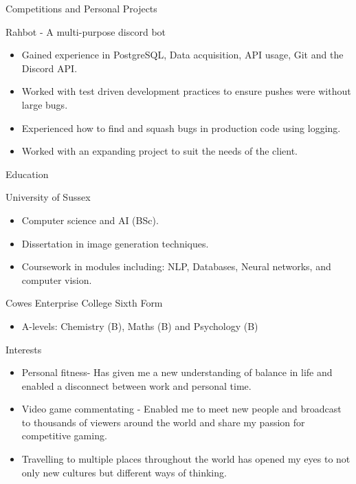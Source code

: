 \documentclass[a4paper]{article}
\newlength{\tabin}
\newlength{\secsep}
\newcommand{\lineunder}{\vspace*{-8pt} \\ \hspace*{-6pt} \hrulefill \\ \vspace*{-15pt}}
\newenvironment{tabbedsection}[1]{
  \begin{list}{}{
      \setlength{\itemsep}{0pt}
      \setlength{\labelsep}{0pt}
      \setlength{\labelwidth}{0pt}
      \setlength{\leftmargin}{\tabin}
      \setlength{\rightmargin}{\tabin}
      \setlength{\listparindent}{0pt}
      \setlength{\parsep}{0pt}
      \setlength{\parskip}{0pt}
      \setlength{\partopsep}{0pt}
      \setlength{\topsep}{#1}
    }
  \item[]
}{\end{list}}
\newenvironment{resume_section}[1]{
  \filbreak
  \vspace{2\secsep}
  \textsc{\large#1}
  \lineunder
  \begin{tabbedsection}{\secsep}
}{\end{tabbedsection}}
\newenvironment{resume_subsection}[2][]{
  \textbf{#2} \hfill {\footnotesize #1} \hspace{2em}
  \begin{tabbedsection}{0.5\secsep}
}{\end{tabbedsection}}
\newenvironment{subitems}{
  \renewcommand{\labelitemi}{-}
  \begin{itemize}
      \setlength{\labelsep}{1em}
}{\end{itemize}}
\begin{document}
\begin{resume_section}{Competitions and Personal Projects}
  
   \begin{resume_subsection}{Rahbot - A multi-purpose discord bot}
    \begin{subitems}
        \item Gained experience in PostgreSQL, Data acquisition, API usage, Git and the Discord API.
        \item Worked with test driven development practices to ensure pushes were without large bugs.
        \item Experienced how to find and squash bugs in production code using logging.
        \item Worked with an expanding project to suit the needs of the client.
    \end{subitems}
  \end{resume_subsection}
\end{resume_section}

\begin{resume_section}{Education}
  \begin{resume_subsection}[Brighton (2018-2022)]{University of Sussex}
    \begin{subitems}
      \item Computer science and AI (BSc).
      \item Dissertation in image generation techniques. 
      \item Coursework in modules including: NLP, Databases, Neural networks, and computer vision.
    \end{subitems}
  \end{resume_subsection}
  
  \begin{resume_subsection}{Cowes Enterprise College Sixth Form}
    \begin{subitems}
      \item A-levels: Chemistry (B), Maths (B) and Psychology (B)
     \end{subitems}
  \end{resume_subsection}
\end{resume_section}

\begin{resume_section}{Interests}
  \begin{subitems}
   \item Personal fitness- Has given me a new understanding of balance in life and enabled a disconnect between work and personal time.
   \item Video game commentating - Enabled me to meet new people and broadcast to thousands of viewers around the world and share my passion for competitive gaming. 
   \item Travelling to multiple places throughout the world has opened my eyes to not only new cultures but different ways of thinking.
   \end{subitems}
\end{resume_section}
\end{document}
